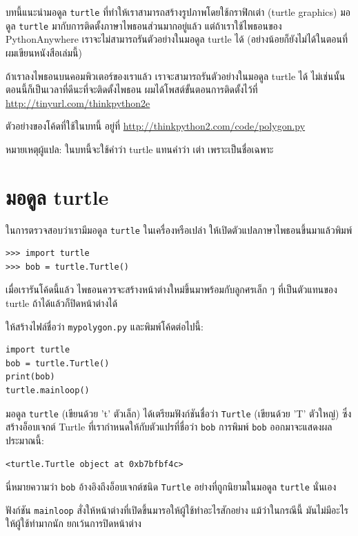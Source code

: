 บทนี้แนะนำมอดูล {\tt turtle} ที่ทำให้เราสามารถสร้างรูปภาพโดยใช้กราฟิกเต่า (turtle graphics)
มอดูล {\tt turtle} มากับการติดตั้งภาษาไพธอนส่วนมากอยู่แล้ว แต่ถ้าเราใช้ไพธอนของ PythonAnywhere
เราจะไม่สามารถรันตัวอย่างในมอดูล turtle ได้ (อย่างน้อยก็ยังไม่ได้ในตอนที่ผมเขียนหนังสือเล่มนี้)

ถ้าเราลงไพธอนบนคอมพิวเตอร์ของเราแล้ว เราจะสามารถรันตัวอย่างในมอดูล turtle ได้ 
ไม่เช่นนั้น ตอนนี้ก็เป็นเวลาที่ดีนะที่จะติดตั้งไพธอน  ผมได้โพสต์ขั้นตอนการติดตั้งไว้ที่ \url{http://tinyurl.com/thinkpython2e}

ตัวอย่างของโค้ดที่ใช้ในบทนี้ อยู่ที่ \url{http://thinkpython2.com/code/polygon.py}

หมายเหตุผู้แปล: ในบทนี้จะใช้คำว่า turtle แทนคำว่า เต่า เพราะเป็นชื่อเฉพาะ

\section{มอดูล turtle} %
\label{turtle}

ในการตรวจสอบว่าเรามีมอดูล {\tt turtle} ในเครื่องหรือเปล่า ให้เปิดตัวแปลภาษาไพธอนขึ้นมาแล้วพิมพ์

\begin{verbatim}
>>> import turtle
>>> bob = turtle.Turtle()
\end{verbatim}

เมื่อเรารันโค้ดนี้แล้ว ไพธอนควรจะสร้างหน้าต่างใหม่ขึ้นมาพร้อมกับลูกศรเล็ก ๆ ที่เป็นตัวแทนของ turtle
ถ้าได้แล้วก็ปิดหน้าต่างได้

ให้สร้างไฟล์ชื่อว่า {\tt mypolygon.py} และพิมพ์โค้ดต่อไปนี้:

\begin{verbatim}
import turtle
bob = turtle.Turtle()
print(bob)
turtle.mainloop()
\end{verbatim}
%
มอดูล {\tt turtle} (เขียนด้วย 't' ตัวเล็ก) ได้เตรียมฟังก์ชันชื่อว่า {\tt Turtle} (เขียนด้วย 'T' ตัวใหญ่) 
ซึ่งสร้างอ็อบเจกต์ Turtle ที่เรากำหนดให้กับตัวแปรที่ชื่อว่า {\tt bob} การพิมพ์ {\tt bob} ออกมาจะแสดงผลประมาณนี้:

\begin{verbatim}
<turtle.Turtle object at 0xb7bfbf4c>
\end{verbatim}
%
นี่หมายความว่า {\tt bob} อ้างอิงถึงอ็อบเจกต์ชนิด {\tt Turtle} อย่างที่ถูกนิยามในมอดูล {\tt turtle} นั่นเอง

ฟังก์ชัน \verb"mainloop" สั่งให้หน้าต่างที่เปิดขึ้นมารอให้ผู้ใช้ทำอะไรสักอย่าง แม้ว่าในกรณีนี้ มันไม่มีอะไร
ให้ผู้ใช้ทำมากนัก ยกเว้นการปิดหน้าต่าง


